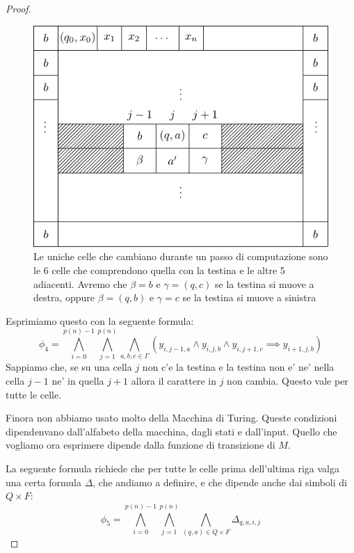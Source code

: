 \begin{proof}
    \begin{figure}[h]
        \begin{center}
            \includegraphics{./img/nondeterminism/SATproof3.pdf}
            \caption{Le uniche celle che cambiano durante un passo di computazione sono le 6 celle
                che comprendono quella con la testina e le altre 5 adiacenti. Avremo che $\beta = b$ e
                $\gamma = (q,c)$ se la testina si muove a destra, oppure $\beta = (q,b)$ e $\gamma = c$
            se la testina si muove a sinistra}
        \end{center}
    \end{figure}

    Esprimiamo questo con la seguente formula:
    \begin{equation*}
        \phi_{4} = \bigwedge_{i=0}^{p(n)-1}\bigwedge_{j=1}^{p(n)}\bigwedge_{a,b,c\in \Gamma}
        (y_{i,j-1,a} \land y_{i,j,b} \land y_{i,j+1,c} \implies y_{i+1,j,b})
    \end{equation*}
    Sappiamo che, se su una cella $j$ non c'e la testina e la testina non e' ne' nella cella $j-1$
    ne' in quella $j+1$ allora il carattere in $j$ non cambia.  Questo vale per tutte le celle.

    Finora non abbiamo usato molto della Macchina di Turing. Queste condizioni dipendenvano
    dall'alfabeto della macchina, dagli stati e dall'input. Quello che vogliamo ora esprimere
    dipende dalla funzione di transizione di $M$.

    La seguente formula richiede che per tutte le celle prima dell'ultima riga valga una certa
    formula $\Delta$, che andiamo a definire, e che dipende anche dai simboli di $Q \times F$:
    \begin{equation*}
        \phi_{5} = \bigwedge_{i=0}^{p(n)-1}\bigwedge_{j=1}^{p(n)}\bigwedge_{(q,a)\in Q\times F}
        \Delta_{q,a,i,j}
    \end{equation*}


\end{proof}
